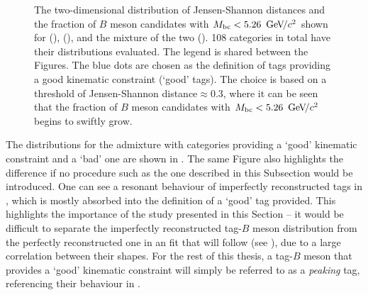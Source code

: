 \begin{figure}[htbp!]
    \centering
    \caption{\label{fig:good_tags_jsdists} The two-dimensional distribution of Jensen-Shannon distances and the fraction of $B$ meson candidates with ${M_{\mathrm{bc}}}<5.26~{\mathrm{\,Ge\kern -0.1em V\!/}c^2}$
    shown for \BptoXsgamma (), \BztoXsgamma (), and the mixture of the two ().
    108 categories in total have their \Mbc distributions evaluated.
    The legend is shared between the Figures.
    The blue dots are chosen as the definition of tags providing a good kinematic constraint (`good' tags).
    The choice is based on a threshold of Jensen-Shannon distance$\approx0.3$, where it can be seen that the fraction of $B$ meson candidates with ${M_{\mathrm{bc}}}<5.26~{\mathrm{\,Ge\kern -0.1em V\!/}c^2}$ begins to swiftly grow.
    }
\end{figure}

The \Mbc distributions for \BtoXsgamma the admixture with categories providing a `good' kinematic constraint and a `bad' one are shown in .
The same Figure also highlights the difference if no procedure such as the one described in this Subsection would be introduced.
One can see a resonant behaviour of imperfectly reconstructed tags in , which is mostly absorbed into the definition of a `good' tag provided.
This highlights the importance of the study presented in this Section -- it would be difficult to separate the imperfectly reconstructed tag-$B$ meson distribution from the perfectly reconstructed one in an \Mbc fit that will follow (see ), due to a large correlation between their shapes.
For the rest of this thesis, a tag-$B$ meson that provides a `good' kinematic constraint will simply be referred to as a \textit{peaking} tag, referencing their behaviour in \Mbc.

